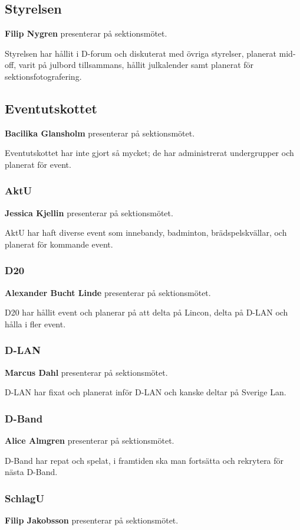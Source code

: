 \documentclass[../protokoll-vintermote-2024.tex]{subfiles}
\begin{document}
\subsection{Styrelsen}
\textbf{Filip Nygren} presenterar på sektionsmötet. 
 
Styrelsen har hållit i D-forum och diskuterat med övriga styrelser, planerat mid-off, varit på julbord tillsammans, hållit julkalender samt planerat för sektionsfotografering.

\subsection{Eventutskottet}
\textbf{Bacilika Glansholm} presenterar på sektionsmötet.

Eventutskottet har inte gjort så mycket; de har administrerat undergrupper och planerat för event.

\subsubsection{AktU}
\textbf{Jessica Kjellin} presenterar på sektionsmötet.

AktU har haft diverse event som innebandy, badminton, brädspelskvällar, och planerat för kommande event.

\subsubsection{D20}
\textbf{Alexander Bucht Linde} presenterar på sektionsmötet. 

D20 har hållit event och planerar på att delta på Lincon, delta på D-LAN och hålla i fler event.

\subsubsection{D-LAN}
\textbf{Marcus Dahl} presenterar på sektionsmötet. 

D-LAN har fixat och planerat inför D-LAN och kanske deltar på Sverige Lan.

\subsubsection{D-Band}
\textbf{Alice Almgren} presenterar på sektionsmötet. 

D-Band har repat och spelat, i framtiden ska man fortsätta och rekrytera för nästa D-Band.

\subsubsection{SchlagU}
\textbf{Filip Jakobsson} presenterar på sektionsmötet. 
\end{document}
